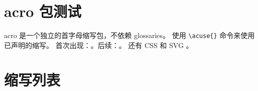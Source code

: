 \documentclass{article}
\begin{document}
\section{acro 包测试}

acro 是一个独立的首字母缩写包，不依赖 glossaries。
使用 \texttt{\textbackslash acuse\{\}} 命令来使用已声明的缩写。
首次出现：。后续：。
还有 CSS  和 SVG 。

\section{缩写列表}

\printacronyms
\end{document}
